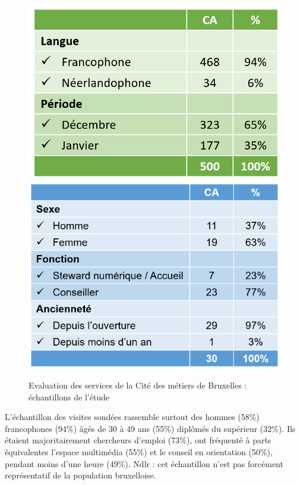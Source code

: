 \documentclass[french,a4paper,12pt]{article}
\begin{document}
\begin{center}
\begin{figure}
\includegraphics[scale=0.4]{8-cdm-echantillon2.PNG}
\includegraphics[scale=1.4]{8-cdm-echantillon3.PNG}
\end{figure}
\begin{figure}[h]
\caption{Evaluation des services de la Cité des métiers de Bruxelles : échantillons de l'étude}
\end{figure}
\end{center}

\quad L’échantillon des visites sondées rassemble surtout des hommes (58\%) francophones (94\%) âgés de 30 à 49 ans (55\%) diplômés du supérieur (32\%). Ils étaient majoritairement chercheurs d’emploi (73\%), ont fréquenté à parts équivalentes l’espace multimédia (55\%) et le conseil en orientation (50\%), pendant moins d’une heure (49\%). Ndlr : cet échantillon n’est pas forcément représentatif de la population bruxelloise.
\end{document}
